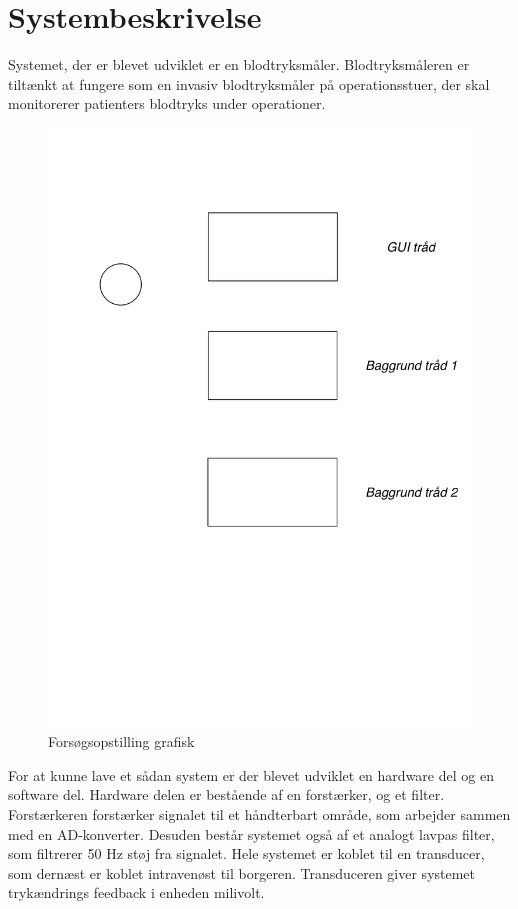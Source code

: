 \chapter{Systembeskrivelse}
Systemet, der er blevet udviklet er en blodtryksmåler. Blodtryksmåleren er tiltænkt at fungere som en invasiv blodtryksmåler på operationsstuer, der skal monitorerer patienters blodtryks under operationer.\\

\begin{figure}[H]
	\centering
	\includegraphics[width=1\textwidth]{Figurer/Systembeskrivelse}
	\caption{Forsøgsopstilling grafisk}
	\label{opstilling}
\end{figure} 
For at kunne lave et sådan system er der blevet udviklet en hardware del og en software del. 
Hardware delen er bestående af en forstærker, og et filter. Forstærkeren forstærker signalet til et håndterbart område, som arbejder sammen med en AD-konverter. Desuden består systemet også af et analogt lavpas filter, som filtrerer 50 Hz støj fra signalet. Hele systemet er koblet til en transducer, som dernæst er koblet intravenøst til borgeren. Transduceren giver systemet trykændrings feedback i enheden milivolt.  \\ [1ex]

